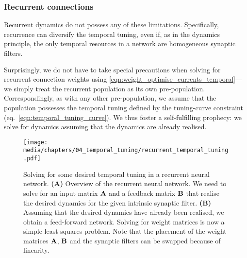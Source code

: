 \subsubsection{Recurrent connections}

Recurrent dynamics do not possess any of these limitations.
Specifically, recurrence can diversify the temporal tuning, even if, as in the \NEF dynamics principle, the only temporal resources in a network are homogeneous synaptic filters.

Surprisingly, we do not have to take special precautions when solving for recurrent connection weights using \cref{eqn:weight_optimise_currents_temporal}---we simply treat the recurrent population as its own pre-population.
Correspondingly, as with any other pre-population, we assume that the population possesses the temporal tuning defined by the tuning-curve constraint (eq.~\ref{eqn:temporal_tuning_curve}).
We thus foster a self-fulfilling prophecy: we solve for dynamics assuming that the dynamics are already realised.


\begin{figure}
	\centering
	\texttt{[image: media/chapters/04\_temporal\_tuning/recurrent\_temporal\_tuning.pdf]}
	\caption[Solving for some desired temporal tuning in a recurrent neural network]{Solving for some desired temporal tuning in a recurrent neural network. \textbf{(A)} Overview of the recurrent neural network. We need to solve for an input matrix $\mathbf{A}$ and a feedback matrix $\mathbf{B}$ that realise the desired dynamics for the given intrinsic synaptic filter.
	\textbf{(B)} Assuming that the desired dynamics have already been realised, we obtain a feed-forward network.
	Solving for weight matrices is now a simple least-squares problem.
	Note that the placement of the weight matrices $\mathbf{A}$, $\mathbf{B}$ and the synaptic filters can be swapped because of linearity.
	}
	\label{fig:recurrent_temporal_tuning}
\end{figure}

